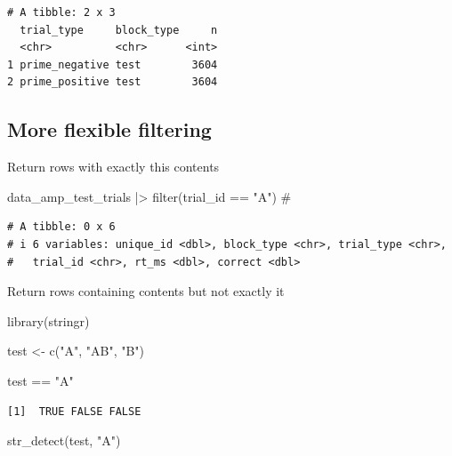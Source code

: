 \documentclass[
  letterpaper,
  DIV=11,
  numbers=noendperiod]{scrreprt}
\newenvironment{Shaded}{\begin{snugshade}}{\end{snugshade}}
\newcommand{\CommentTok}[1]{\textcolor[rgb]{0.37,0.37,0.37}{#1}}
\newcommand{\FunctionTok}[1]{\textcolor[rgb]{0.28,0.35,0.67}{#1}}
\newcommand{\NormalTok}[1]{\textcolor[rgb]{0.00,0.23,0.31}{#1}}
\newcommand{\OtherTok}[1]{\textcolor[rgb]{0.00,0.23,0.31}{#1}}
\newcommand{\SpecialCharTok}[1]{\textcolor[rgb]{0.37,0.37,0.37}{#1}}
\newcommand{\StringTok}[1]{\textcolor[rgb]{0.13,0.47,0.30}{#1}}
\begin{document}
\begin{verbatim}
# A tibble: 2 x 3
  trial_type     block_type     n
  <chr>          <chr>      <int>
1 prime_negative test        3604
2 prime_positive test        3604
\end{verbatim}

\subsection{More flexible filtering}\label{more-flexible-filtering}

Return rows with exactly this contents

\begin{Shaded}
\begin{Highlighting}[]
\NormalTok{data\_amp\_test\_trials }\SpecialCharTok{|\textgreater{}}
  \FunctionTok{filter}\NormalTok{(trial\_id }\SpecialCharTok{==} \StringTok{"A"}\NormalTok{) }\CommentTok{\# }
\end{Highlighting}
\end{Shaded}

\begin{verbatim}
# A tibble: 0 x 6
# i 6 variables: unique_id <dbl>, block_type <chr>, trial_type <chr>,
#   trial_id <chr>, rt_ms <dbl>, correct <dbl>
\end{verbatim}

Return rows containing contents but not exactly it

\begin{Shaded}
\begin{Highlighting}[]
\FunctionTok{library}\NormalTok{(stringr)}

\NormalTok{test }\OtherTok{\textless{}{-}} \FunctionTok{c}\NormalTok{(}\StringTok{"A"}\NormalTok{, }\StringTok{"AB"}\NormalTok{, }\StringTok{"B"}\NormalTok{)}

\NormalTok{test }\SpecialCharTok{==} \StringTok{"A"}
\end{Highlighting}
\end{Shaded}

\begin{verbatim}
[1]  TRUE FALSE FALSE
\end{verbatim}

\begin{Shaded}
\begin{Highlighting}[]
\FunctionTok{str\_detect}\NormalTok{(test, }\StringTok{"A"}\NormalTok{)}
\end{Highlighting}
\end{Shaded}
\end{document}
